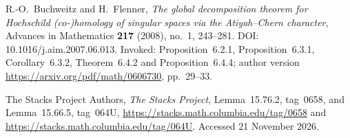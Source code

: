 R.-O.~Buchweitz and H.~Flenner,
\emph{The global decomposition theorem for Hochschild (co-)homology
of singular spaces via the Atiyah--Chern character},
Advances in Mathematics \textbf{217} (2008), no.~1, 243--281.
DOI: 10.1016/j.aim.2007.06.013.
Invoked: Proposition~6.2.1, Proposition~6.3.1, Corollary~6.3.2,
Theorem~6.4.2 and Proposition~6.4.4; author version
\url{https://arxiv.org/pdf/math/0606730}, pp.~29--33.

The Stacks Project Authors, \emph{The Stacks Project},
Lemma~15.76.2, tag~0658, and Lemma~15.66.5, tag~064U,
\url{https://stacks.math.columbia.edu/tag/0658} and
\url{https://stacks.math.columbia.edu/tag/064U}.
Accessed 21 November 2026.
